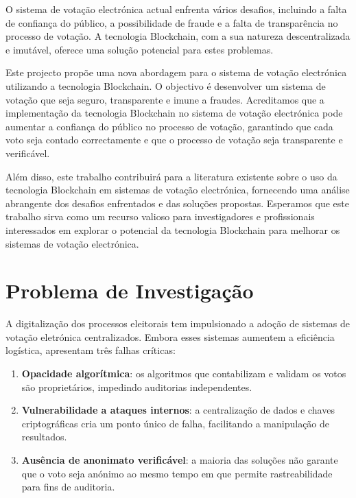 O sistema de votação electrónica actual enfrenta vários desafios, incluindo a falta de confiança do público, a possibilidade de fraude e a falta de transparência no processo de votação. A tecnologia Blockchain, com a sua natureza descentralizada e imutável, oferece uma solução potencial para estes problemas.

Este projecto propõe uma nova abordagem para o sistema de votação electrónica utilizando a tecnologia Blockchain. O objectivo é desenvolver um sistema de votação que seja seguro, transparente e imune a fraudes. Acreditamos que a implementação da tecnologia Blockchain no sistema de votação electrónica pode aumentar a confiança do público no processo de votação, garantindo que cada voto seja contado correctamente e que o processo de votação seja transparente e verificável.

Além disso, este trabalho contribuirá para a literatura existente sobre o uso da tecnologia Blockchain em sistemas de votação electrónica, fornecendo uma análise abrangente dos desafios enfrentados e das soluções propostas. Esperamos que este trabalho sirva como um recurso valioso para investigadores e profissionais interessados em explorar o potencial da tecnologia Blockchain para melhorar os sistemas de votação electrónica.

\section{Problema de Investigação}

A digitalização dos processos eleitorais tem impulsionado a adoção de sistemas de votação eletrónica centralizados. Embora esses sistemas aumentem a eficiência logística, apresentam três falhas críticas:

\begin{enumerate}
    \item \textbf{Opacidade algorítmica}: os algoritmos que contabilizam e validam os votos são proprietários, impedindo auditorias independentes.
    \item \textbf{Vulnerabilidade a ataques internos}: a centralização de dados e chaves criptográficas cria um ponto único de falha, facilitando a manipulação de resultados.
    \item \textbf{Aus{\^e}ncia de anonimato verific{\'a}vel}: a maioria das solu{\c{c}}{\~o}es n{\~a}o garante que o voto seja an{\'o}nimo ao mesmo tempo em que permite rastreabilidade para fins de auditoria.
\end{enumerate}

